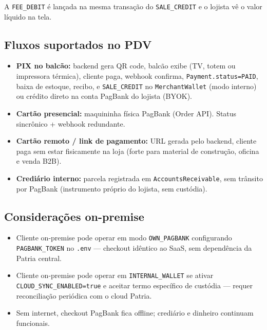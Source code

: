 \documentclass[11pt,a4paper]{article}
\begin{document}
A \texttt{FEE\_DEBIT} é lançada na mesma transação do \texttt{SALE\_CREDIT}
e o lojista vê o valor líquido na tela.

\subsection{Fluxos suportados no PDV}

\begin{itemize}[leftmargin=2em]
  \item \textbf{PIX no balcão:} backend gera QR code, balcão exibe (TV,
        totem ou impressora térmica), cliente paga, webhook confirma,
        \texttt{Payment.status=PAID}, baixa de estoque, recibo, e
        \texttt{SALE\_CREDIT} no \texttt{MerchantWallet} (modo interno) ou
        crédito direto na conta PagBank do lojista (BYOK).
  \item \textbf{Cartão presencial:} maquininha física PagBank (Order API).
        Status sincrônico + webhook redundante.
  \item \textbf{Cartão remoto / link de pagamento:} URL gerada pelo
        backend, cliente paga sem estar fisicamente na loja (forte para
        material de construção, oficina e venda B2B).
  \item \textbf{Crediário interno:} parcela registrada em
        \texttt{AccountsReceivable}, sem trânsito por PagBank
        (instrumento próprio do lojista, sem custódia).
\end{itemize}

\subsection{Considerações on-premise}

\begin{itemize}[leftmargin=2em]
  \item Cliente on-premise pode operar em modo \texttt{OWN\_PAGBANK}
        configurando \texttt{PAGBANK\_TOKEN} no \texttt{.env} --- checkout
        idêntico ao SaaS, sem dependência da Patria central.
  \item Cliente on-premise pode operar em \texttt{INTERNAL\_WALLET} se
        ativar \texttt{CLOUD\_SYNC\_ENABLED=true} e aceitar termo
        específico de custódia --- requer reconciliação periódica com o
        cloud Patria.
  \item Sem internet, checkout PagBank fica offline; crediário e
        dinheiro continuam funcionais.
\end{itemize}
\end{document}
